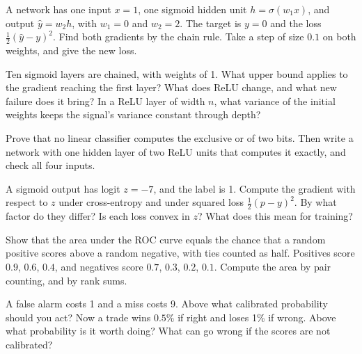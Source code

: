 \begin{question}\label{iq:iv1:machine-learning:21}
A network has one input $x = 1$, one sigmoid hidden unit $h = \sigma(w_1x)$, and output $\hat{y} = w_2h$, with $w_1 = 0$ and $w_2 = 2$. The target is $y = 0$ and the loss $\frac12(\hat{y} - y)^2$. Find both gradients by the chain rule. Take a step of size $0.1$ on both weights, and give the new loss.
\end{question}

\begin{question}\label{iq:iv1:machine-learning:22}
Ten sigmoid layers are chained, with weights of 1. What upper bound applies to the gradient reaching the first layer? What does ReLU change, and what new failure does it bring? In a ReLU layer of width $n$, what variance of the initial weights keeps the signal's variance constant through depth?
\end{question}

\begin{question}\label{iq:iv1:machine-learning:23}
Prove that no linear classifier computes the exclusive or of two bits. Then write a network with one hidden layer of two ReLU units that computes it exactly, and check all four inputs.
\end{question}

\begin{question}\label{iq:iv1:machine-learning:24}
A sigmoid output has logit $z = -7$, and the label is 1. Compute the gradient with respect to $z$ under cross-entropy and under squared loss $\frac12(p - y)^2$. By what factor do they differ? Is each loss convex in $z$? What does this mean for training?
\end{question}

\begin{question}\label{iq:iv1:machine-learning:25}
Show that the area under the ROC curve equals the chance that a random positive scores above a random negative, with ties counted as half. Positives score $0.9$, $0.6$, $0.4$, and negatives score $0.7$, $0.3$, $0.2$, $0.1$. Compute the area by pair counting, and by rank sums.
\end{question}

\begin{question}\label{iq:iv1:machine-learning:26}
A false alarm costs 1 and a miss costs 9. Above what calibrated probability should you act? Now a trade wins $0.5\%$ if right and loses 1\% if wrong. Above what probability is it worth doing? What can go wrong if the scores are not calibrated?
\end{question}


